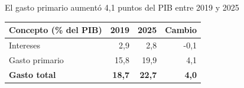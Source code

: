 \begin{frame}{El gasto primario aumentó 4,1 puntos del PIB entre 2019 y 2025}
\centering
\small
\begin{tabular}{lrrr}
\toprule
\textbf{Concepto (\% del PIB)} & \textbf{2019} & \textbf{2025} & \textbf{Cambio} \\
\midrule
Intereses               & 2,9  & 2,8  & -0,1 \\
Gasto primario          & 15,8 & 19,9 &  4,1 \\
\midrule
\textbf{Gasto total}    & \textbf{18,7} & \textbf{22,7} & \textbf{4,0} \\
\bottomrule
\end{tabular}
\end{frame}